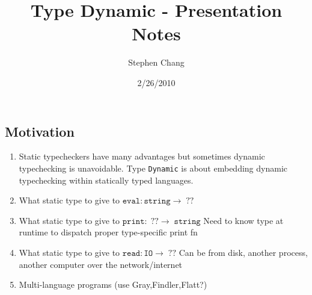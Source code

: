 \documentclass[12pt]{article}	%
\begin{document}
\newcommand{\Dynamic}{\texttt{Dynamic}\xspace}
\newcommand{\typecase}{\texttt{typecase}\xspace}
\newcommand{\dynamic}{\texttt{dynamic}\xspace}
\newcommand{\wrong}{\texttt{wrong}\xspace}
\newcommand{\deno}[1]{ \ensuremath{[\![#1]\!]} }
\newcommand{\code}[1]{$\mathtt{#1}$}
\newcommand{\pair}[2]{ \ensuremath{\left\langle #1,#2 \right\rangle} }
\newcommand{\pairtt}[2]{ \ensuremath{\left\langle \mathtt{#1,#2} \right\rangle} }


\title{Type Dynamic - Presentation Notes}
\author{Stephen Chang}
\date{2/26/2010}
\maketitle

\subsection*{Motivation}
\begin{enumerate}
	\item Static typecheckers have many advantages but sometimes dynamic typechecking is unavoidable. Type \Dynamic is about embedding dynamic typechecking within statically typed languages.
	\item What static type to give to \code{eval:string\rightarrow\;??}
	\item What static type to give to \code{print:\;??\rightarrow\;string}
	      Need to know type at runtime to dispatch proper type-specific print fn
	\item What static type to give to \code{read:IO\rightarrow\;??}
	      Can be from disk, another process, another computer over the network/internet
	\item Multi-language programs (use Gray,Findler,Flatt?)
\end{enumerate}
\end{document}
